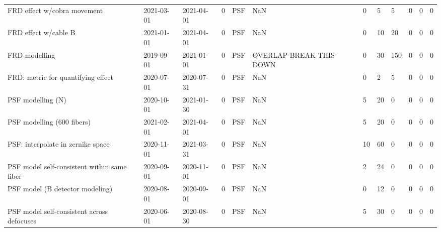 \begin{longtable}{llllp{2cm}llllll}
                 FRD effect w/cobra movement &  2021-03-01 &  2021-04-01 &         0 &            PSF &                      NaN &      0 &       5 &        5 &       0 &     0 &          0 \\
                        FRD effect w/cable B &  2021-01-01 &  2021-04-01 &         0 &            PSF &                      NaN &      0 &      10 &       20 &       0 &     0 &          0 \\
                               FRD modelling &  2019-09-01 &  2021-01-01 &         0 &            PSF &  OVERLAP-BREAK-THIS-DOWN &      0 &      30 &      150 &       0 &     0 &          0 \\
          FRD: metric for quantifying effect &  2020-07-01 &  2020-07-31 &         0 &            PSF &                      NaN &      0 &       2 &        5 &       0 &     0 &          0 \\
                           PSF modelling (N) &  2020-10-01 &  2021-01-30 &         0 &            PSF &                      NaN &      5 &      20 &        0 &       0 &     0 &          0 \\
                  PSF modelling (600 fibers) &  2021-02-01 &  2021-04-01 &         0 &            PSF &                      NaN &      5 &      20 &        0 &       0 &     0 &          0 \\
           PSF: interpolate in zernike space &  2020-11-01 &  2021-03-31 &         0 &            PSF &                      NaN &     10 &      60 &        0 &       0 &     0 &          0 \\
 PSF model self-consistent within same fiber &  2020-09-01 &  2020-11-01 &         0 &            PSF &                      NaN &      2 &      24 &        0 &       0 &     0 &          0 \\
             PSF model (B detector modeling) &  2020-08-01 &  2020-09-01 &         0 &            PSF &                      NaN &      0 &      12 &        0 &       0 &     0 &          0 \\
  PSF model self-consistent across defocuses &  2020-06-01 &  2020-08-30 &         0 &            PSF &                      NaN &      5 &      30 &        0 &       0 &     0 &          0 \\
\end{longtable}
